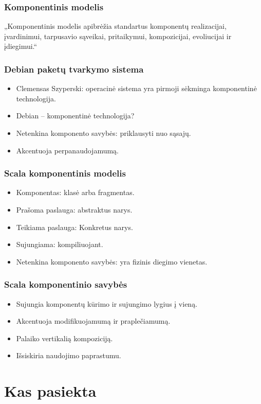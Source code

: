 \begin{frame}
  \frametitle{Komponentinis modelis}
  „Komponentinis modelis apibrėžia standartus komponentų
  realizacijai, įvardinimui, tarpusavio sąveikai, pritaikymui,
  kompozicijai, evoliucijai ir įdiegimui.“
\end{frame}

\begin{frame}
  \frametitle{Debian paketų tvarkymo sistema}
  \begin{itemize}
    \item Clemensas Szyperski: operacinė sistema yra pirmoji sėkminga
      komponentinė technologija.
    \item Debian – komponentinė technologija?
    \item Netenkina komponento savybės: priklausyti nuo sąsajų.
    \item Akcentuoja perpanaudojamumą.
  \end{itemize}
\end{frame}

\begin{frame}
  \frametitle{Scala komponentinis modelis}
  \begin{itemize}
    \item Komponentas: klasė arba fragmentas.
    \item Prašoma paslauga: abstraktus narys.
    \item Teikiama paslauga: Konkretus narys.
    \item Sujungiama: kompiliuojant.
    \item Netenkina komponento savybės: yra fizinis diegimo vienetas.
  \end{itemize}
\end{frame}

\begin{frame}
  \frametitle{Scala komponentinio savybės}
  \begin{itemize}
    \item Sujungia komponentų kūrimo ir sujungimo lygius į vieną.
    \item Akcentuoja modifikuojamumą ir praplečiamumą.
    \item Palaiko vertikalią kompoziciją.
    \item Išsiskiria naudojimo paprastumu.
  \end{itemize}
\end{frame}

\section{Kas pasiekta}

